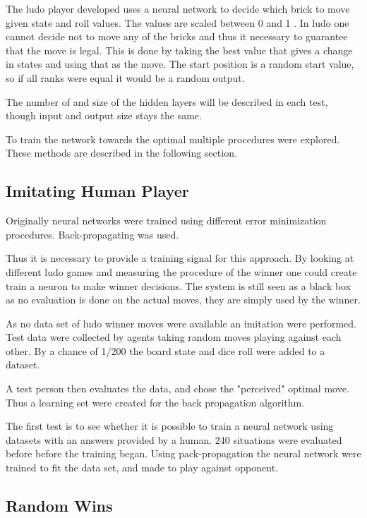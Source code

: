 \documentclass{llncs}
\begin{document}
The ludo player developed uses a neural network to decide which brick to move given state and roll values. The values are scaled between 0 and 1 . In ludo one cannot decide not to move any of the bricks and thus it necessary to guarantee that the move is legal. This is done by taking the best value that gives a change in states and using that as the move. The start position is a random start value, so if all ranks were equal it would be a random output.

The number of and size of the hidden layers will be described in each test, though input and output size stays the same.

To train the network towards the optimal multiple procedures were explored. These methods are described in the following section.

\subsection*{Imitating Human Player}
 

Originally neural networks were trained using different error minimization procedures. 
Back-propagating was used.


Thus it is necessary to provide a training signal for this approach. By looking at different ludo games and measuring the procedure of the winner one could create train a neuron to make winner decisions. The system is still seen as a black box as no evaluation is done on the actual moves, they are simply used by the winner.

As no data set of ludo winner moves were available an imitation were performed. Test data were collected by agents taking random moves playing against each other. By a chance of 1/200 the board state and dice roll were added to a dataset. 

A test person then evaluates the data, and chose the "perceived" optimal move. Thus a learning set were created for the back propagation algorithm.

The first test is to see whether it is possible to train a neural network using datasets with an answers provided by a human. 240 situations were evaluated before before the training began. Using pack-propagation the neural network were trained to fit the data set, and made to play against opponent. 


\subsection*{Random Wins}
\end{document}
